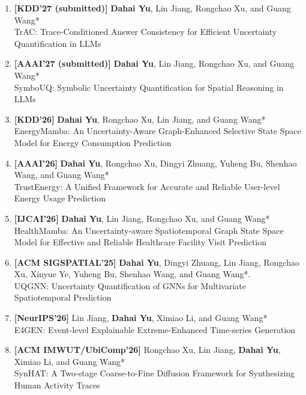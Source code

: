 \documentclass[a4paper,12pt]{article}
\newcommand{\jourpub}[1]{\textcolor{PubJournal}{\textbf{[#1]}}}
\begin{document}
\begin{enumerate}[leftmargin=1.2em,label=\arabic*.,itemsep=1pt,topsep=1pt]


\item \jourpub{KDD'27 (submitted)} \textbf{Dahai Yu}, Lin Jiang, Rongchao Xu, and Guang Wang* \\
TrAC: Trace-Conditioned Answer Consistency for Efficient Uncertainty Quantification in LLMs

\item \jourpub{AAAI'27 (submitted)} \textbf{Dahai Yu}, Lin Jiang, Rongchao Xu, and Guang Wang* \\
SymboUQ: Symbolic Uncertainty Quantification for Spatial Reasoning in LLMs

\item \jourpub{KDD'26} \textbf{Dahai Yu}, Rongchao Xu, Lin Jiang, and Guang Wang* \\
EnergyMamba: An Uncertainty-Aware Graph-Enhanced Selective State Space Model for Energy Consumption Prediction

\item \jourpub{AAAI'26} \textbf{Dahai Yu}, Rongchao Xu, Dingyi Zhuang, Yuheng Bu, Shenhao Wang, and Guang Wang* \\
TrustEnergy: A Unified Framework for Accurate and Reliable User-level Energy Usage Prediction

\item \jourpub{IJCAI'26} \textbf{Dahai Yu}, Lin Jiang, Rongchao Xu, and Guang Wang* \\
HealthMamba: An Uncertainty-aware Spatiotemporal Graph State Space Model for Effective and Reliable Healthcare Facility Visit Prediction

\item \jourpub{ACM SIGSPATIAL'25} \textbf{Dahai Yu}, Dingyi Zhuang, Lin Jiang, Rongchao Xu, Xinyue Ye, Yuheng Bu, Shenhao Wang, and Guang Wang*. \\
UQGNN: Uncertainty Quantification of GNNs for Multivariate Spatiotemporal Prediction

\item \jourpub{NeurIPS'26} Lin Jiang, \textbf{Dahai Yu}, Ximiao Li, and Guang Wang* \\
E4GEN: Event-level Explainable Extreme-Enhanced Time-series Generation

\item \jourpub{ACM IMWUT/UbiComp'26} Rongchao Xu, Lin Jiang, \textbf{Dahai Yu}, Ximiao Li, and Guang Wang* \\
SynHAT: A Two-stage Coarse-to-Fine Diffusion Framework for Synthesizing Human Activity Traces


\end{enumerate}
\end{document}
